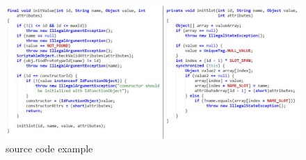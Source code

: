 \begin{figure}[!htp]
\center
%
%
%
%
%
%
%
%
%
%
%
%
%
%
%
%
%
%
%
%
%
%
\includegraphics[width=16cm]{img/codeExample.pdf}
 \caption{\label{figure:sourceCodeExample}source code example}
\end{figure}



